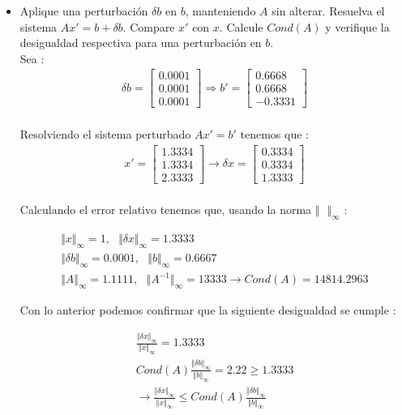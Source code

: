\documentclass{article}
\begin{document}
\begin{enumerate}
\begin{itemize}
\item Aplique una perturbaci\'on $\delta b$ en $b$, manteniendo $A$ sin alterar. Resuelva el sistema $Ax' = b + \delta b$. Compare $x'$ con $x$. Calcule $Cond(A)$ y verifique la desigualdad respectiva para una perturbaci\'on en $b$.
\\
Sea :
\begin{gather*}
\delta b = 
	\begin{bmatrix} 
		0.0001 \\
		0.0001 \\
		0.0001 
	\end{bmatrix}
\Rightarrow
b' = 
	\begin{bmatrix}
		 0.6668 \\
		 0.6668 \\
		-0.3331
	\end{bmatrix}
\end{gather*}
\\
Resolviendo el sistema perturbado $Ax'=b'$ tenemos que :
\begin{gather*}
x' = 
	\begin{bmatrix}
		1.3334 \\
		1.3334 \\
		2.3333
	\end{bmatrix}
\rightarrow 
\delta x = 
	\begin{bmatrix}
		0.3334 \\
		0.3334 \\
		1.3333
	\end{bmatrix}
\end{gather*}
\\
Calculando el error relativo tenemos que, usando la norma 
$\Vert \textit{ } \Vert_{\infty}$ :

\begin{gather*}
\Vert x \Vert_{\infty} = 1,\textit{ }
\Vert \delta x \Vert_{\infty} = 1.3333 \\
\Vert \delta b \Vert_{\infty} = 0.0001,\textit{ }
\Vert  b \Vert_{\infty} = 0.6667 \\
\Vert  A \Vert_{\infty} = 1.1111,\textit{ }
\Vert  A^{-1} \Vert_{\infty} = 13333 \rightarrow Cond(A) = 14814.2963
\end{gather*}

Con lo anterior podemos confirmar que la siguiente desigualdad se cumple :

\begin{gather*}
\frac{ \Vert \delta x \Vert_{\infty} }{\Vert x \Vert_{\infty}} = 1.3333 \\
Cond(A) \frac{ \Vert \delta b \Vert_{\infty} }{ \Vert b \Vert_{\infty} } = 2.22 \geq 1.3333 \\
\rightarrow 
	\frac{ \Vert \delta x \Vert_{\infty} }{\Vert x \Vert_{\infty}} 
	\leq 
	Cond(A) \frac{ \Vert \delta b \Vert_{\infty} }{ \Vert b \Vert_{\infty} }
\end{gather*}


\end{itemize}
\end{enumerate}
\end{document}
